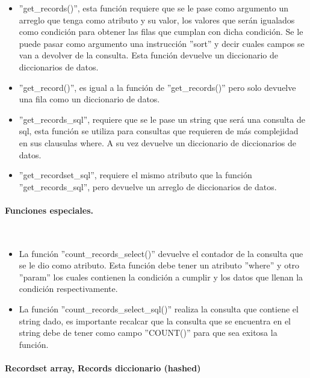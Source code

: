 \begin{itemize}
      \begin{itemize}
        \item ''get\_records()'', esta función requiere que se le pase como argumento un arreglo que tenga como atributo y su valor, los valores que serán igualados como condición para obtener las filas que cumplan con dicha condición. Se le puede pasar como argumento una instrucción ''sort'' y decir cuales campos se van a devolver de la consulta. Esta función devuelve un diccionario de diccionarios de datos.
        \item ''get\_record()'', es igual a la función de ''get\_records()'' pero solo devuelve una fila como un diccionario de datos.
        \item ''get\_records\_sql'', requiere que se le pase un string que será una consulta de sql, esta función se utiliza para consultas que requieren de más complejidad en sus clausulas where. A su vez devuelve un diccionario de diccionarios de datos.
        \item ''get\_recordset\_sql'', requiere el mismo atributo que la función ''get\_records\_sql'', pero devuelve un arreglo de diccionarios de datos.
      \end{itemize}

    \end{itemize}

    \paragraph{Funciones especiales.}\mbox{}\\

\begin{itemize}
  \item La función ''count\_records\_select()'' devuelve el contador de la consulta que se le dio como atributo. Esta función debe tener un atributo ''where'' y otro ''param'' los cuales contienen la condición a cumplir y los datos que llenan la condición respectivamente.
  \item La función ''count\_records\_select\_sql()'' realiza la consulta que contiene el string dado, es importante recalcar que la consulta que se encuentra en el string debe de tener como campo ''COUNT()'' para que sea exitosa la función.
\end{itemize}

    \paragraph{Recordset array, Records diccionario (hashed)}\mbox{}\\

